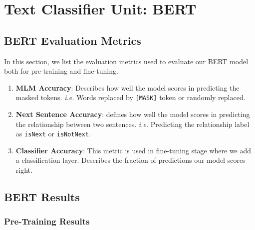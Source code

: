 \section{Text Classifier Unit: BERT}
\label{res:s2}

\subsection{BERT Evaluation Metrics}
\label{res:s2_sub1}

In this section, we list the evaluation metrics used to evaluate our \ac{BERT} model both for pre-training and fine-tuning.
\begin{enumerate}
	\item \textbf{\acf{MLM} Accuracy}: Describes how well the model scores in predicting the masked tokens. \textit{i.e.} Words replaced by \texttt{[MASK]} token or randomly replaced.
	\item \textbf{Next Sentence Accuracy}: defines how well the model scores in predicting the relationship between two sentences. \textit{i.e.} Predicting the relationship label as \texttt{isNext} or \texttt{isNotNext}.
	\item \textbf{Classifier Accuracy}: This metric is used in fine-tuning stage where we add a classification layer. Describes the fraction of predictions our model scores right.
\end{enumerate}


\subsection{BERT Results}
\label{res:s2_sub2}

\subsubsection{Pre-Training Results}
\label{res:s2_sub2_subsub1}

